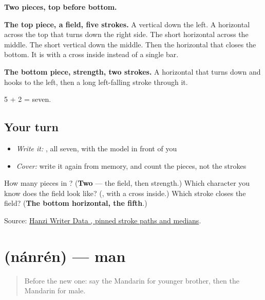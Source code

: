 \begin{quote}
\end{quote}

\textbf{Two pieces, top before bottom.}

\textbf{The top piece, a field, five strokes.} A vertical down the left. A horizontal across the top that turns down the right side. The short horizontal across the middle. The short vertical down the middle. Then the horizontal that closes the bottom. It is  with a cross inside instead of a single bar.

\textbf{The bottom piece, strength, two strokes.} A horizontal that turns down and hooks to the left, then a long left-falling stroke through it.

5 + 2 = seven.

\subsection*{Your turn}
\begin{itemize}
\raggedright
  \item \emph{Write it:} , all seven, with the model in front of you
  \item \emph{Cover:} write it again from memory, and count the pieces, not the strokes
\end{itemize}

\begin{tcolorbox}[breakable,colback=teal!4,colframe=teal!35!black,title={Before you move on}]
How many pieces in ? (\textbf{Two} — the field, then strength.) Which character you know does the field look like? (\textbf{}, with a cross inside.) Which stroke closes the field? (\textbf{The bottom horizontal, the fifth}.)

Source: \href{https://raw.githubusercontent.com/chanind/hanzi-writer-data/68d10a4b21150cae5e1ebbd223eed289cf32d90c/data/\%E7\%94\%B7.json}{Hanzi Writer Data , pinned stroke paths and medians}.
\end{tcolorbox}
\section[\texorpdfstring{\zh{男人} (nánrén)}{男人 (nánrén)}]{ (nánrén) — man}

\label{lesson:ZH-C33-nanren}



\begin{quote}
Before the new one: say the Mandarin for younger brother, then the Mandarin for male.
\end{quote}

